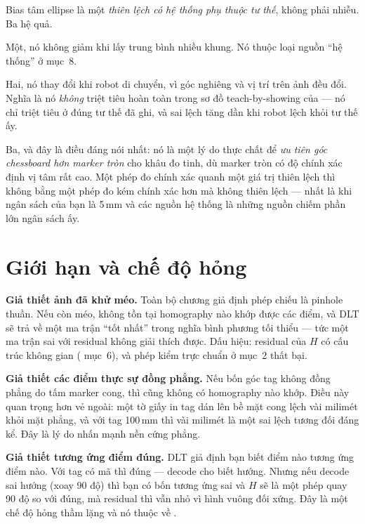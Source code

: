 \documentclass[../../marker.tex]{subfiles}
\begin{document}
\begin{cannho}
Bias tâm ellipse là một \emph{thiên lệch có hệ thống phụ thuộc tư thế}, không phải nhiễu. Ba hệ quả.

Một, nó không giảm khi lấy trung bình nhiều khung. Nó thuộc loại nguồn ``hệ thống'' ở  mục~8.

Hai, nó thay đổi khi robot di chuyển, vì góc nghiêng và vị trí trên ảnh đều đổi. Nghĩa là nó \emph{không} triệt tiêu hoàn toàn trong sơ đồ teach-by-showing của  --- nó chỉ triệt tiêu ở đúng tư thế đã ghi, và sai lệch tăng dần khi robot lệch khỏi tư thế ấy.

Ba, và đây là điều đáng nói nhất: nó là một lý do thực chất để \emph{ưu tiên góc chessboard hơn marker tròn} cho khâu đo tinh, dù marker tròn có độ chính xác định vị tâm rất cao. Một phép đo chính xác quanh một giá trị thiên lệch thì không bằng một phép đo kém chính xác hơn mà không thiên lệch --- nhất là khi ngân sách của bạn là 5\,mm và các nguồn hệ thống là những nguồn chiếm phần lớn ngân sách ấy.
\end{cannho}

\section{Giới hạn và chế độ hỏng}

\textbf{Giả thiết ảnh đã khử méo.} Toàn bộ chương giả định phép chiếu là pinhole thuần. Nếu còn méo, không tồn tại homography nào khớp được các điểm, và DLT sẽ trả về một ma trận ``tốt nhất'' trong nghĩa bình phương tối thiểu --- tức một ma trận sai với residual không giải thích được. Dấu hiệu: residual của \(H\) có cấu trúc không gian ( mục~6), và phép kiểm trực chuẩn ở mục~2 thất bại.

\textbf{Giả thiết các điểm thực sự đồng phẳng.} Nếu bốn góc tag không đồng phẳng do tấm marker cong, thì cũng không có homography nào khớp. Điều này quan trọng hơn vẻ ngoài: một tờ giấy in tag dán lên bề mặt cong lệch vài milimét khỏi mặt phẳng, và với tag 100\,mm thì vài milimét là một sai lệch tương đối đáng kể. Đây là lý do  nhấn mạnh nền cứng phẳng.

\textbf{Giả thiết tương ứng điểm đúng.} DLT giả định bạn biết điểm nào tương ứng điểm nào. Với tag có mã thì đúng --- decode cho biết hướng. Nhưng nếu decode sai hướng (xoay 90 độ) thì bạn có bốn tương ứng sai và \(H\) sẽ là một phép quay 90 độ so với đúng, mà residual thì vẫn nhỏ vì hình vuông đối xứng. Đây là một chế độ hỏng thầm lặng và nó thuộc về .
\end{document}
